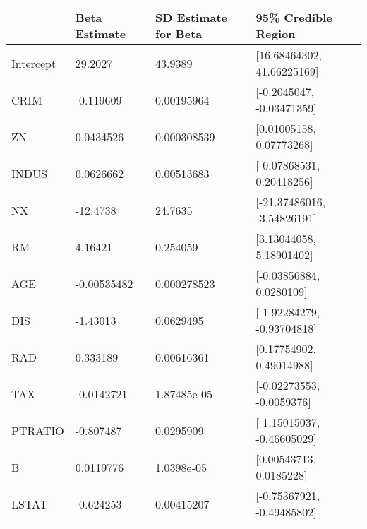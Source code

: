 \begin{tabular}{llll}
\hline
           & Beta Estimate   & SD Estimate for Beta   & 95\% Credible Region         \\
\hline
 Intercept & 29.2027         & 43.9389                & [16.68464302, 41.66225169]  \\
 CRIM      & -0.119609       & 0.00195964             & [-0.2045047, -0.03471359]   \\
 ZN        & 0.0434526       & 0.000308539            & [0.01005158, 0.07773268]    \\
 INDUS     & 0.0626662       & 0.00513683             & [-0.07868531, 0.20418256]   \\
 NX        & -12.4738        & 24.7635                & [-21.37486016, -3.54826191] \\
 RM        & 4.16421         & 0.254059               & [3.13044058, 5.18901402]    \\
 AGE       & -0.00535482     & 0.000278523            & [-0.03856884, 0.0280109]    \\
 DIS       & -1.43013        & 0.0629495              & [-1.92284279, -0.93704818]  \\
 RAD       & 0.333189        & 0.00616361             & [0.17754902, 0.49014988]    \\
 TAX       & -0.0142721      & 1.87485e-05            & [-0.02273553, -0.0059376]   \\
 PTRATIO   & -0.807487       & 0.0295909              & [-1.15015037, -0.46605029]  \\
 B         & 0.0119776       & 1.0398e-05             & [0.00543713, 0.0185228]     \\
 LSTAT     & -0.624253       & 0.00415207             & [-0.75367921, -0.49485802]  \\
\hline
\end{tabular}